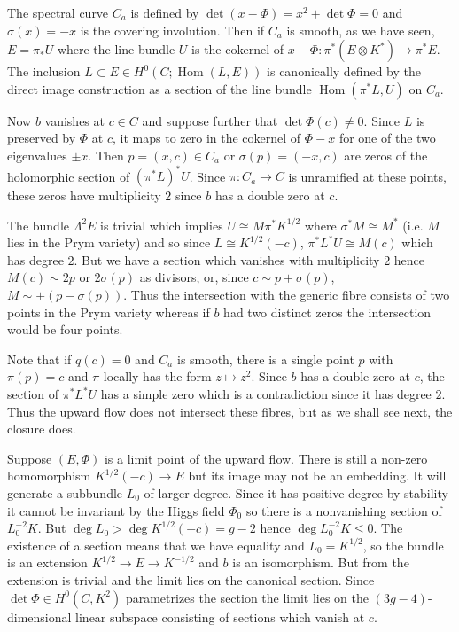 \documentclass[12pt]{article}
\numberwithin{equation}{section}
\theoremstyle{remark}
\theoremstyle{definition}
\numberwithin{theorem}{section}
\DeclareMathOperator{\Hom}{Hom}
\renewcommand{\1}{\mathbbm{1}}
\begin{document}
The spectral curve  $ C_a$ is defined by $\det(x-\Phi)=x^2+\det \Phi=0$ and $\sigma(x)= -x$ is the covering involution. Then if $ C_a$ is smooth, as we have seen, $E=\pi_*U$ where the line
bundle $U$ is the cokernel of $x-\Phi:\pi^*(E\otimes K^*)\rightarrow \pi^*E$. The inclusion $L\subset E\in H^0(C;\Hom(L,E))$ is canonically defined 
by the direct image construction as a section of the line bundle $\Hom (\pi^*L,U)$ on $C_a$.

Now $b$ vanishes at  $c\in C$ and suppose further that $\det \Phi(c)\ne 0$. Since  $L$ is preserved by $\Phi$ at $c$, it  maps to zero in the cokernel 
of $\Phi-x$ for one of the two eigenvalues $\pm x$. Then $p=(x,c)\in  C_a$ or $\sigma(p)=(-x,c)$ are zeros of the holomorphic section of $(\pi^*L)^*U$.
Since $\pi:C_a\rightarrow C$ is unramified at these points, these zeros have multiplicity $2$ since $b$ has a double zero at $c$.


The bundle $\Lambda^2 E$ is trivial which implies $U\cong M\pi^*K^{1/2}$ where $\sigma^*M\cong M^*$ (i.e. $M$ lies in the Prym variety) and so 
since $L\cong K^{1/2}(-c)$, $\pi^*L^* U\cong M(c)$ which has degree $2$. But we have a section which vanishes with multiplicity $2$ 
hence $M(c)\sim 2p$ or $2\sigma(p)$ as divisors, or, since $c\sim p+\sigma(p)$, $M\sim \pm(p-\sigma(p))$. Thus the 
intersection with the generic fibre consists of two points in the Prym variety whereas if $b$ had two distinct zeros the intersection 
would be four points. 

Note that if $q(c)=0$ and $C_a$ is smooth, there is a single point $p$ with $\pi(p)=c$ and $\pi$ locally has the form $z\mapsto z^2$. Since $b$ has a double zero at $c$, the section of $\pi^*L^* U$ has a simple zero which is a contradiction since it has degree $2$. Thus the upward flow does not intersect these fibres, but as we shall see next, the closure does. 

Suppose $(E,\Phi)$ is a limit point of the upward flow. There is still a non-zero homomorphism $K^{1/2}(-c)\rightarrow E$ but its image may not be an
embedding. It will generate a subbundle $L_0$ of larger degree. Since it has positive degree by  stability it cannot be invariant by the Higgs 
field $\Phi_0$ so there is a nonvanishing section of $L_0^{-2}K$. But $\deg L_0>\deg K^{1/2}(-c)=g-2$ hence $\deg L_0^{-2}K\le 0$. 
The existence of a section means that we have equality and $L_0=K^{1/2}$, so the bundle is an extension $K^{1/2}\rightarrow E\rightarrow 
K^{-1/2}$ and $b$ is an isomorphism. But from \cite[Proposition 3.3]{hitchin} the extension is trivial and the limit lies on the canonical section. Since 
$\det \Phi\in  H^0(C,K^2)$ parametrizes the section the limit lies on 
the $(3g-4)$-dimensional  linear subspace consisting of sections which vanish at $c$.  
\end{document}
